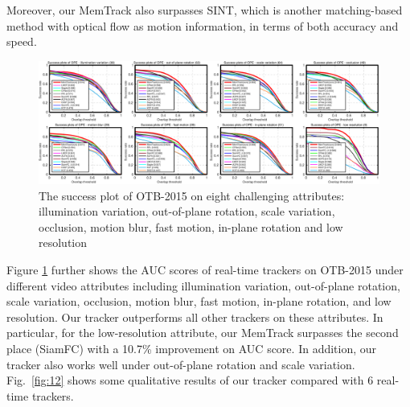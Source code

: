 \documentclass[runningheads]{llncs}
\newcommand{\yty}[1]{\textcolor{black}{#1}}
\begin{document}
Moreover, our MemTrack also surpasses SINT, which is another matching-based method with optical flow as motion information, in terms of both accuracy and speed.
\begin{figure}[t]
	\begin{center}
		\includegraphics[width=\linewidth]{figs/realtime-attri-tb100.pdf}
	\end{center}
	\caption{The success plot of OTB-2015 on eight challenging attributes: illumination variation, out-of-plane rotation, scale variation, occlusion, motion blur, fast motion, in-plane rotation and low resolution }
	\label{fig:11}
\end{figure}
Figure \ref{fig:11} further shows the AUC scores of real-time trackers on OTB-2015 under different video attributes including illumination variation, out-of-plane rotation, scale variation, occlusion, motion blur, fast motion, in-plane rotation, and low resolution. Our tracker outperforms all other trackers on these attributes. In particular, for the low-resolution attribute, our MemTrack surpasses the second place (SiamFC) with a 10.7\% improvement on AUC score. %
In addition, our tracker also works well under out-of-plane rotation and scale variation.
Fig.~\ref{fig:12} shows some qualitative results of our tracker compared with 6 real-time trackers. 

\end{document}
